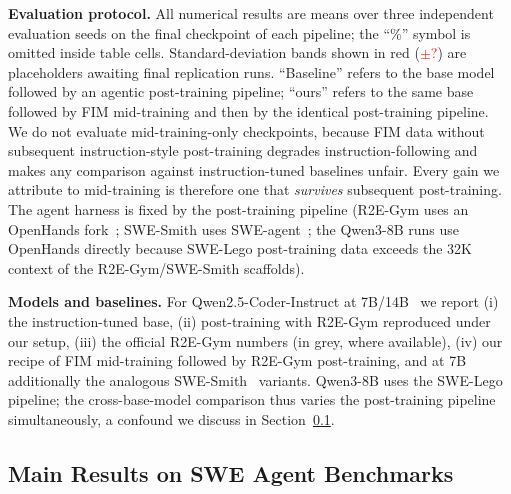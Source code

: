 \textbf{Evaluation protocol.}
All numerical results are means over three independent evaluation seeds
on the final checkpoint of each pipeline; the ``\%'' symbol is omitted
inside table cells. Standard-deviation bands shown in red
(\textcolor{red}{$\pm$?}) are placeholders awaiting final replication
runs. ``Baseline'' refers to the base model followed by an agentic
post-training pipeline; ``ours'' refers to the same base followed by FIM
mid-training and then by the identical post-training pipeline. We do not
evaluate mid-training-only checkpoints, because FIM data without
subsequent instruction-style post-training degrades instruction-following
and makes any comparison against instruction-tuned baselines unfair.
Every gain we attribute to mid-training is therefore one that
\emph{survives} subsequent post-training. The agent harness is fixed by
the post-training pipeline (R2E-Gym uses an OpenHands fork~\citep{openhands,
r2egym}; SWE-Smith uses SWE-agent~\citep{sweagent}; the Qwen3-8B runs use
OpenHands directly because SWE-Lego post-training data exceeds the 32K
context of the R2E-Gym/SWE-Smith scaffolds).

\textbf{Models and baselines.}
For Qwen2.5-Coder-Instruct at 7B/14B~\citep{qwencoder} we report
(i) the instruction-tuned base, (ii) post-training with R2E-Gym
reproduced under our setup, (iii) the official R2E-Gym numbers (in grey,
where available), (iv) our recipe of FIM mid-training followed by
R2E-Gym post-training, and at 7B additionally the analogous
SWE-Smith~\citep{swesmith} variants. Qwen3-8B uses the
SWE-Lego~\citep{swelego} pipeline; the cross-base-model comparison thus
varies the post-training pipeline simultaneously, a confound we discuss
in Section~\ref{sec:exp:main}.

\vspace{-0.5ex}
\subsection{Main Results on SWE Agent Benchmarks}
\label{sec:exp:main}

